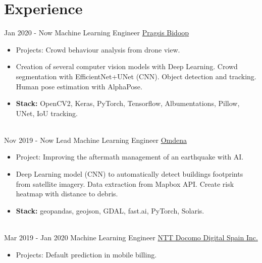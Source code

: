 \documentclass[letterpaper]{twentysecondcv} %
\begin{document}
\makeprofile %




\section{Experience}
\begin{twenty} %

\twentyitem
    	{Jan 2020 - }
		{Now}
        {Machine Learning Engineer}
        {\href{https://pragsis.com/}{Pragsis Bidoop}}
        {}
        {\begin{itemize}
			\item Projects: Crowd behaviour analysis from drone view.
			\item Creation of several computer vision models with Deep Learning. Crowd segmentation with EfficientNet+UNet (CNN). Object detection and tracking. Human pose estimation with AlphaPose.
			\item \textbf{Stack:} OpenCV2, Keras, PyTorch, Tensorflow, Albumentations, Pillow, UNet, IoU tracking.
        \end{itemize}}
        \\
\twentyitem
    	{Nov 2019 - }
		{Now}
        {Lead Machine Learning Engineer}
        {\href{https://omdena.com}{Omdena}}
        {}
        {\begin{itemize}
			\item Project: Improving the aftermath management of an earthquake with AI.
			\item Deep Learning model (CNN) to automatically detect buildings footprints from satellite imagery. Data extraction from Mapbox API. Create risk heatmap with distance to debris.
			\item \textbf{Stack:} geopandas, geojson, GDAL, fast.ai, PyTorch, Solaris.
        \end{itemize}}
        \\
\twentyitem
    	{Mar 2019 - }
		{Jan 2020}
        {Machine Learning Engineer}
        {\href{https://www.docomodigital.com/}{NTT Docomo Digital Spain Inc.}}
        {}
        {\begin{itemize}
        \item Projects: Default prediction in mobile billing. 

\end{itemize}}
\end{twenty}
\end{document}
